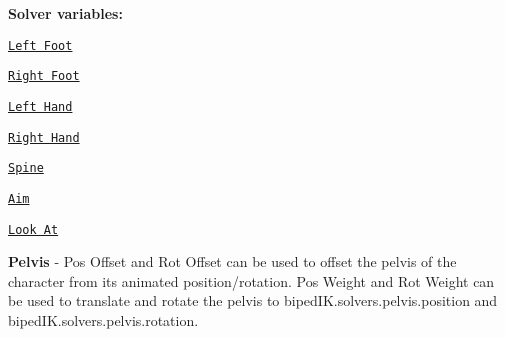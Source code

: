 {\bfseries Solver variables\+:}
\begin{DoxyItemize}
\item \href{page7.html}{\tt Left Foot}
\item \href{page7.html}{\tt Right Foot}
\item \href{page7.html}{\tt Left Hand}
\item \href{page7.html}{\tt Right Hand}
\item \href{page4.html}{\tt Spine}
\item \href{page1.html}{\tt Aim}
\item \href{page8.html}{\tt Look At}
\item {\bfseries Pelvis} -\/ Pos Offset and Rot Offset can be used to offset the pelvis of the character from it\textquotesingle{}s animated position/rotation. Pos Weight and Rot Weight can be used to translate and rotate the pelvis to biped\+I\+K.\+solvers.\+pelvis.\+position and biped\+I\+K.\+solvers.\+pelvis.\+rotation.
\end{DoxyItemize}

 